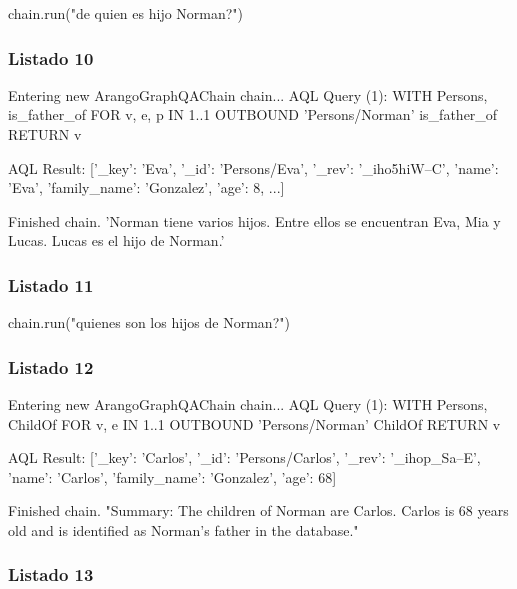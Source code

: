 \begin{APACode}
chain.run("de quien es hijo Norman?")
\end{APACode}

\subsubsection{Listado 10}
\label{anexo:code-4-4-1-10}

\begin{APACode}
Entering new ArangoGraphQAChain chain...
AQL Query (1):
WITH Persons, is_father_of
FOR v, e, p IN 1..1 OUTBOUND 'Persons/Norman' is_father_of
RETURN v

AQL Result:
[{'_key': 'Eva', '_id': 'Persons/Eva', '_rev': '_iho5hiW--C',
  'name': 'Eva', 'family_name': 'Gonzalez', 'age': 8, ...}]

Finished chain.
'Norman tiene varios hijos. Entre ellos se encuentran Eva, Mia y Lucas. Lucas es el hijo de Norman.'
\end{APACode}

\subsubsection{Listado 11}
\label{anexo:code-4-4-1-11}

\begin{APACode}
chain.run("quienes son los hijos de Norman?")
\end{APACode}

\subsubsection{Listado 12}
\label{anexo:code-4-4-1-12}

\begin{APACode}
Entering new ArangoGraphQAChain chain...
AQL Query (1):
WITH Persons, ChildOf
FOR v, e IN 1..1 OUTBOUND 'Persons/Norman' ChildOf
RETURN v

AQL Result:
[{'_key': 'Carlos', '_id': 'Persons/Carlos', '_rev': '_ihop_Sa--E',
  'name': 'Carlos', 'family_name': 'Gonzalez', 'age': 68}]

Finished chain.
"Summary: The children of Norman are Carlos. Carlos is 68 years old and is identified as Norman's father in the database."
\end{APACode}

\subsubsection{Listado 13}
\label{anexo:code-4-4-1-13}

